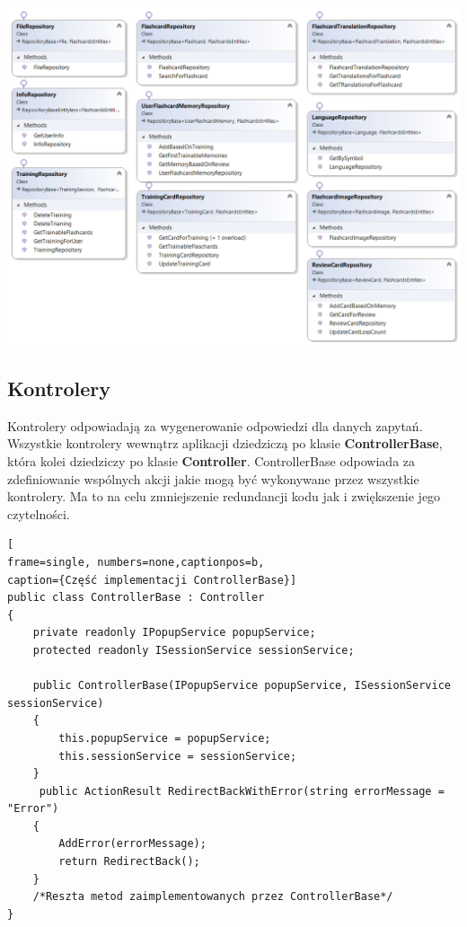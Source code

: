 \begin{landscape}
\begin{center}
	\includegraphics[width=\textwidth]{images/Repos.png}
\end{center}
\end{landscape}


\subsection{Kontrolery}

Kontrolery odpowiadają za wygenerowanie odpowiedzi dla danych zapytań. Wszystkie kontrolery wewnątrz aplikacji dziedziczą po klasie \textbf{ControllerBase}, która kolei dziedziczy po klasie \textbf{Controller}. ControllerBase odpowiada za zdefiniowanie wspólnych akcji jakie mogą być wykonywane przez wszystkie kontrolery. Ma to na celu zmniejszenie redundancji kodu jak i zwiększenie jego czytelności.

\begin{minipage}{\linewidth}
\begin{lstlisting}[
frame=single, numbers=none,captionpos=b, 
caption={Część implementacji ControllerBase}]
public class ControllerBase : Controller
{
	private readonly IPopupService popupService;
	protected readonly ISessionService sessionService;

	public ControllerBase(IPopupService popupService, ISessionService sessionService)
	{
		this.popupService = popupService;
		this.sessionService = sessionService;
	}
	 public ActionResult RedirectBackWithError(string errorMessage = "Error")
	{
		AddError(errorMessage);
		return RedirectBack();
	}
	/*Reszta metod zaimplementowanych przez ControllerBase*/
}
\end{lstlisting}
\end{minipage}

